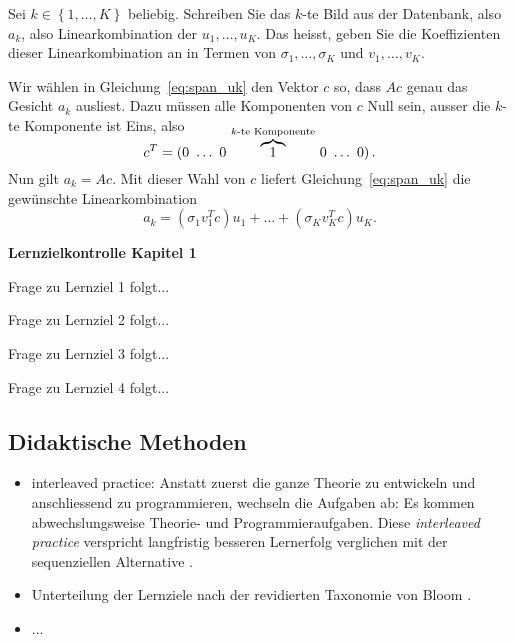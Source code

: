 \begin{aufgabe}
	Sei $k\in\left\{1,\ldots,K\right\}$ beliebig.
	Schreiben Sie das $k$-te Bild aus der Datenbank, also $a_k$, also Linearkombination der $u_1,\ldots,u_K$.
	Das heisst, geben Sie die Koeffizienten dieser Linearkombination an in Termen von $\sigma_1,\ldots,\sigma_K$ und $v_1,\dots,v_K$.
\end{aufgabe}
\begin{losung}
	Wir wählen in Gleichung~\ref{eq:span_uk} den Vektor $c$ so, dass $Ac$ genau das Gesicht $a_k$ ausliest.
	Dazu müssen alle Komponenten von $c$ Null sein, ausser die $k$-te Komponente ist Eins, also
	\begin{equation*}
		c^T=\left(0\ \ldots\ 0\ \smash{\overbrace{1}^{k\textrm{-te Komponente}}}\ 0\ \ldots\ 0\right).
	\end{equation*}
	Nun gilt $a_k=Ac$.
	Mit dieser Wahl von $c$ liefert Gleichung~\eqref{eq:span_uk} die gewünschte Linearkombination
	\begin{equation*}
		a_k=\left(\sigma_1 v_1^Tc\right) u_1+\ldots+\left(\sigma_K v_K^Tc\right) u_K.
	\end{equation*}
\end{losung}

\begin{tcolorbox}
	\centerline{\textbf{Lernzielkontrolle Kapitel 1}}
	\begin{aufgabe}
		Frage zu Lernziel 1 folgt...
	\end{aufgabe}
	\begin{aufgabe}
		Frage zu Lernziel 2 folgt...
	\end{aufgabe}
	\begin{aufgabe}
		Frage zu Lernziel 3 folgt...
	\end{aufgabe}
	\begin{aufgabe}
		Frage zu Lernziel 4 folgt...
	\end{aufgabe}
\end{tcolorbox}

\subsection{Didaktische Methoden}
\begin{itemize}
	\item interleaved practice: Anstatt zuerst die ganze Theorie zu entwickeln und anschliessend zu programmieren, wechseln die Aufgaben ab: Es kommen abwechslungsweise Theorie- und Programmieraufgaben.
	Diese \textit{interleaved practice} verspricht langfristig besseren Lernerfolg verglichen mit der sequenziellen Alternative \cite{Rohrer14}.
	\item Unterteilung der Lernziele nach der revidierten Taxonomie von Bloom \cite{Anderson2001}.
	\item ...
\end{itemize}